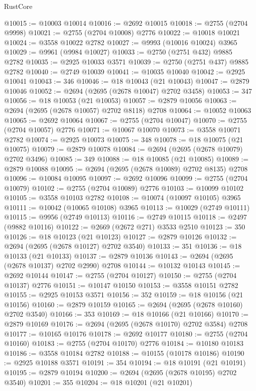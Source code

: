 \begin{lexlean}{RustCore}
\begin{coremodule}
@10015 := @10003 @10014
@10016 := @2692 @10015
@10018 := @2755 (@2704 @9998)
@10021 := @2755 (@2704 @10008) @2776
@10022 := @10018 @10021
@10024 := @3558 @10022 @2782
@10027 := @9993 (@10016 @10024) @3965
@10029 := @9961 (@9984 @10027)
@10033 := @2750 (@2751 @432) @9885 @2782
@10035 := @2925 @10033 @3571
@10039 := @2750 (@2751 @437) @9885 @2782
@10040 := @2749 @10039
@10041 := @10035 @10040
@10042 := @2925 @10041
@10043 := 346
@10046 := @18 @10043 (@21 @10043)
@10047 := @2879 @10046
@10052 := @2694 (@2695 (@2678 @10047) @2702 @3458)
@10053 := 347
@10056 := @18 @10053 (@21 @10053)
@10057 := @2879 @10056
@10063 := @2694 (@2695 (@2678 @10057) @2702 @8118) @2708
@10064 := @10052 @10063
@10065 := @2692 @10064
@10067 := @2755 (@2704 @10047)
@10070 := @2755 (@2704 @10057) @2776
@10071 := @10067 @10070
@10073 := @3558 @10071 @2782
@10074 := @2925 @10073
@10075 := 348
@10078 := @18 @10075 (@21 @10075)
@10079 := @2879 @10078
@10084 := @2694 (@2695 (@2678 @10079) @2702 @3496)
@10085 := 349
@10088 := @18 @10085 (@21 @10085)
@10089 := @2879 @10088
@10095 := @2694 (@2695 (@2678 @10089) @2702 @8135) @2708
@10096 := @10084 @10095
@10097 := @2692 @10096
@10099 := @2755 (@2704 @10079)
@10102 := @2755 (@2704 @10089) @2776
@10103 := @10099 @10102
@10105 := @3558 @10103 @2782
@10108 := @10074 (@10097 @10105) @3965
@10111 := @10042 (@10065 @10108) @3965
@10113 := @10029 (@2749 @10111)
@10115 := @9956 (@2749 @10113)
@10116 := @2749 @10115
@10118 := @2497 (@9882 @10116)
@10122 := @2669 (@2672 @271) @3533 @2510
@10123 := 350
@10126 := @18 @10123 (@21 @10123)
@10127 := @2879 @10126
@10132 := @2694 (@2695 (@2678 @10127) @2702 @3540)
@10133 := 351
@10136 := @18 @10133 (@21 @10133)
@10137 := @2879 @10136
@10143 := @2694 (@2695 (@2678 @10137) @2702 @2990) @2708
@10144 := @10132 @10143
@10145 := @2692 @10144
@10147 := @2755 (@2704 @10127)
@10150 := @2755 (@2704 @10137) @2776
@10151 := @10147 @10150
@10153 := @3558 @10151 @2782
@10155 := @2925 @10153 @3571
@10156 := 352
@10159 := @18 @10156 (@21 @10156)
@10160 := @2879 @10159
@10165 := @2694 (@2695 (@2678 @10160) @2702 @3540)
@10166 := 353
@10169 := @18 @10166 (@21 @10166)
@10170 := @2879 @10169
@10176 := @2694 (@2695 (@2678 @10170) @2702 @3584) @2708
@10177 := @10165 @10176
@10178 := @2692 @10177
@10180 := @2755 (@2704 @10160)
@10183 := @2755 (@2704 @10170) @2776
@10184 := @10180 @10183
@10186 := @3558 @10184 @2782
@10188 := @10155 (@10178 @10186)
@10190 := @2925 @10188 @3571
@10191 := 354
@10194 := @18 @10191 (@21 @10191)
@10195 := @2879 @10194
@10200 := @2694 (@2695 (@2678 @10195) @2702 @3540)
@10201 := 355
@10204 := @18 @10201 (@21 @10201)

\end{coremodule}
\end{lexlean}
